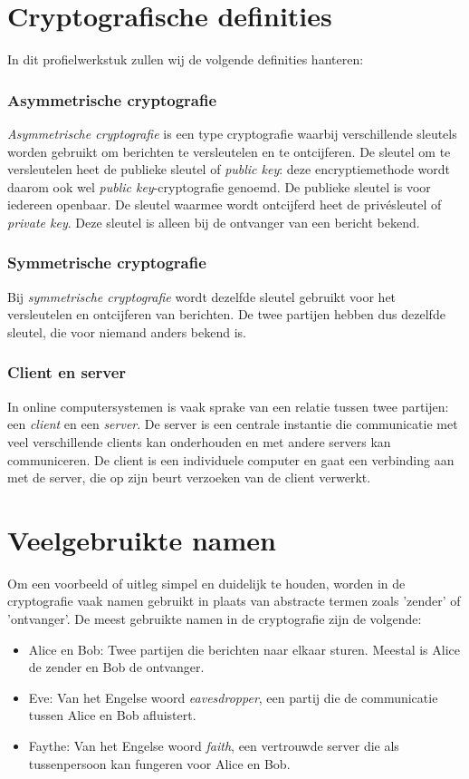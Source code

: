 \documentclass{report} %
\begin{document}
\section{Cryptografische definities}
In dit profielwerkstuk zullen wij de volgende definities hanteren:
\subsubsection{Asymmetrische cryptografie}
\textit{Asymmetrische cryptografie} is een type cryptografie waarbij verschillende sleutels worden gebruikt om berichten te versleutelen en te ontcijferen. De sleutel om te versleutelen heet de publieke sleutel of \textit{public key}: deze encryptiemethode wordt daarom ook wel \textit{public key}-cryptografie genoemd. De publieke sleutel is voor iedereen openbaar. De sleutel waarmee wordt ontcijferd heet de privésleutel of \textit{private key}. Deze sleutel is alleen bij de ontvanger van een bericht bekend.
\subsubsection{Symmetrische cryptografie}
Bij \textit{symmetrische cryptografie} wordt dezelfde sleutel gebruikt voor het versleutelen en ontcijferen van berichten. De twee partijen hebben dus dezelfde sleutel, die voor niemand anders bekend is.
\subsubsection{Client en server}
In online computersystemen is vaak sprake van een relatie tussen twee partijen: een \textit{client} en een \textit{server}. De server is een centrale instantie die communicatie met veel verschillende clients kan onderhouden en met andere servers kan communiceren. De client is een individuele computer en gaat een verbinding aan met de server, die op zijn beurt verzoeken van de client verwerkt.
\section{Veelgebruikte namen}
Om een voorbeeld of uitleg simpel en duidelijk te houden, worden in de cryptografie vaak namen gebruikt in plaats van abstracte termen zoals 'zender' of 'ontvanger'. De meest gebruikte namen in de cryptografie zijn de volgende:
\begin{itemize}
    \item Alice en Bob: Twee partijen die berichten naar elkaar sturen. Meestal is Alice de zender en Bob de ontvanger.
    \item Eve: Van het Engelse woord \textit{eavesdropper}, een partij die de communicatie tussen Alice en Bob afluistert.
    \item Faythe: Van het Engelse woord \textit{faith}, een vertrouwde server die als tussenpersoon kan fungeren voor Alice en Bob.
\end{itemize}
\end{document}
